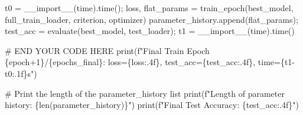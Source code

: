 \documentclass[
  letterpaper,
  DIV=11,
  numbers=noendperiod]{scrartcl}
\newenvironment{Shaded}{\begin{snugshade}}{\end{snugshade}}
\newcommand{\BuiltInTok}[1]{\textcolor[rgb]{0.00,0.23,0.31}{#1}}
\newcommand{\CommentTok}[1]{\textcolor[rgb]{0.37,0.37,0.37}{#1}}
\newcommand{\DecValTok}[1]{\textcolor[rgb]{0.68,0.00,0.00}{#1}}
\newcommand{\NormalTok}[1]{\textcolor[rgb]{0.00,0.23,0.31}{#1}}
\newcommand{\OperatorTok}[1]{\textcolor[rgb]{0.37,0.37,0.37}{#1}}
\newcommand{\RegionMarkerTok}[1]{\textcolor[rgb]{0.00,0.23,0.31}{#1}}
\newcommand{\SpecialCharTok}[1]{\textcolor[rgb]{0.37,0.37,0.37}{#1}}
\newcommand{\SpecialStringTok}[1]{\textcolor[rgb]{0.13,0.47,0.30}{#1}}
\newcommand{\StringTok}[1]{\textcolor[rgb]{0.13,0.47,0.30}{#1}}
\begin{document}
\begin{Shaded}
\begin{Highlighting}[]
\NormalTok{    t0 }\OperatorTok{=} \BuiltInTok{\_\_import\_\_}\NormalTok{(}\StringTok{\textquotesingle{}time\textquotesingle{}}\NormalTok{).time()}\OperatorTok{;}\NormalTok{ loss, flat\_params }\OperatorTok{=}\NormalTok{ train\_epoch(best\_model, full\_train\_loader, criterion, optimizer)}
\NormalTok{    parameter\_history.append(flat\_params)}\OperatorTok{;}\NormalTok{ test\_acc }\OperatorTok{=}\NormalTok{ evaluate(best\_model, test\_loader)}\OperatorTok{;}\NormalTok{ t1 }\OperatorTok{=} \BuiltInTok{\_\_import\_\_}\NormalTok{(}\StringTok{\textquotesingle{}time\textquotesingle{}}\NormalTok{).time()}


    \CommentTok{\# }\RegionMarkerTok{END}\CommentTok{ YOUR CODE HERE}
    \BuiltInTok{print}\NormalTok{(}\SpecialStringTok{f"Final Train Epoch }\SpecialCharTok{\{}\NormalTok{epoch}\OperatorTok{+}\DecValTok{1}\SpecialCharTok{\}}\SpecialStringTok{/}\SpecialCharTok{\{}\NormalTok{epochs\_final}\SpecialCharTok{\}}\SpecialStringTok{: loss=}\SpecialCharTok{\{}\NormalTok{loss}\SpecialCharTok{:.4f\}}\SpecialStringTok{, test\_acc=}\SpecialCharTok{\{}\NormalTok{test\_acc}\SpecialCharTok{:.4f\}}\SpecialStringTok{, time=}\SpecialCharTok{\{}\NormalTok{t1}\OperatorTok{{-}}\NormalTok{t0}\SpecialCharTok{:.1f\}}\SpecialStringTok{s"}\NormalTok{)}

\CommentTok{\# Print the length of the parameter\_history list}
\BuiltInTok{print}\NormalTok{(}\SpecialStringTok{f"Length of parameter history: }\SpecialCharTok{\{}\BuiltInTok{len}\NormalTok{(parameter\_history)}\SpecialCharTok{\}}\SpecialStringTok{"}\NormalTok{)}
\BuiltInTok{print}\NormalTok{(}\SpecialStringTok{f"Final Test Accuracy: }\SpecialCharTok{\{}\NormalTok{test\_acc}\SpecialCharTok{:.4f\}}\SpecialStringTok{"}\NormalTok{)}

\end{Highlighting}
\end{Shaded}
\end{document}
